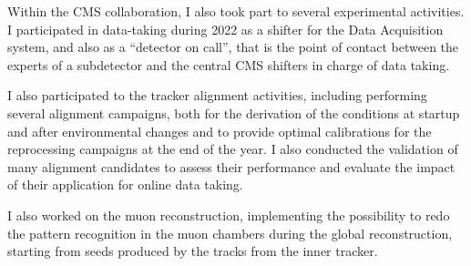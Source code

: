 Within the CMS collaboration, I also took part to several experimental activities.
I participated in data-taking during 2022 as a shifter for the Data Acquisition system,
and also as a ``detector on call'', that is the point of contact between the experts of
a subdetector and the central CMS shifters in charge of data taking.

I also participated to the tracker alignment activities,
including performing several alignment campaigns,
both for the derivation of the conditions at startup and after environmental changes
and to provide optimal calibrations for the reprocessing campaigns at the end of the year.
I also conducted the validation of many alignment candidates to assess their performance
and evaluate the impact of their application for online data taking.

I also worked on the muon reconstruction, implementing the possibility to redo
the pattern recognition in the muon chambers during the global reconstruction,
starting from seeds produced by the tracks from the inner tracker.

